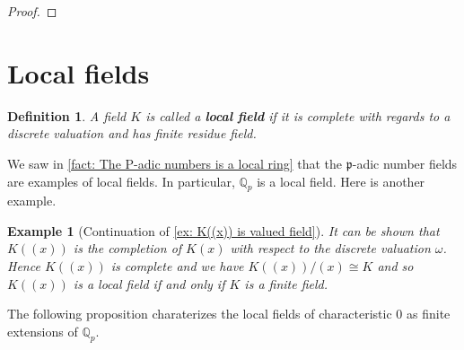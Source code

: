 \documentclass{article}
\newtheorem{definition}{Definition}[section]
\newtheorem{example}{Example}[section]
\newcommand{\mfrak}[1]{\mathfrak{#1}}
\newcommand{\mbb}[1]{\mathbb{#1}}
\numberwithin{equation}{section}
\begin{document}
\begin{proof}


\end{proof}





\section{Local fields}

\begin{definition}\label{def: Local field}
    A field $K$ is called a \textbf{local field} if it is complete with regards to a discrete valuation and has finite residue field.
\end{definition}

We saw in \cref{fact: The P-adic numbers is a local ring} that the $\mfrak p$-adic number fields are examples of local fields. In particular, $\mbb Q_p$ is a local field. Here is another example.
\begin{example}[Continuation of \cref{ex: K((x)) is valued field}]\label{K((x)) is local if K finite}
    It can be shown that $K((x))$ is the completion of $K(x)$ with respect to the discrete valuation $\omega$. Hence $K((x))$ is complete and we have $K((x)) / (x) \cong K$ and so $K((x))$ is a local field if and only if $K$ is a finite field.
\end{example}

The following proposition charaterizes the local fields of characteristic 0 as finite extensions of $\mbb Q_p$.
\end{document}
